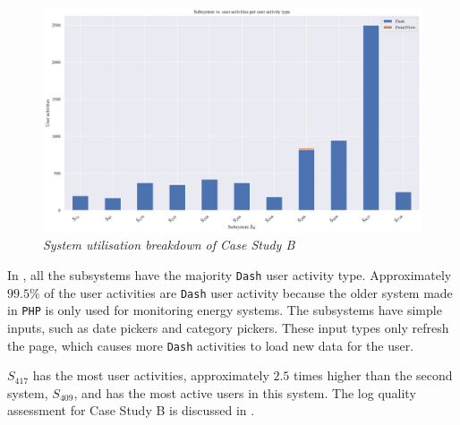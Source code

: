 \begin{figure}[!htb]
	\centering %
	\includegraphics[width=0.95\linewidth]{img/ch3/analysis/case_B_subsystems_1.pdf}
	\caption[System utilisation breakdown of Case Study B]
	{\textit{System utilisation breakdown of Case Study B}}\label{fig:ch3_caseBAnalysis}
\end{figure} 

In , all the subsystems have the majority \texttt{Dash} user activity type. Approximately $99.5\%$ of the user activities are \texttt{Dash} user activity because the older system made in \texttt{PHP} is only used for monitoring energy systems. The subsystems have simple inputs, such as date pickers and category pickers. These input types only refresh the page, which causes more \texttt{Dash} activities to load new data for the user. \par $S_{417}$ has the most user activities, approximately $2.5$ times higher than the second system, $S_{409}$, and has the most active users in this system. The log quality assessment for Case Study B is discussed in .

